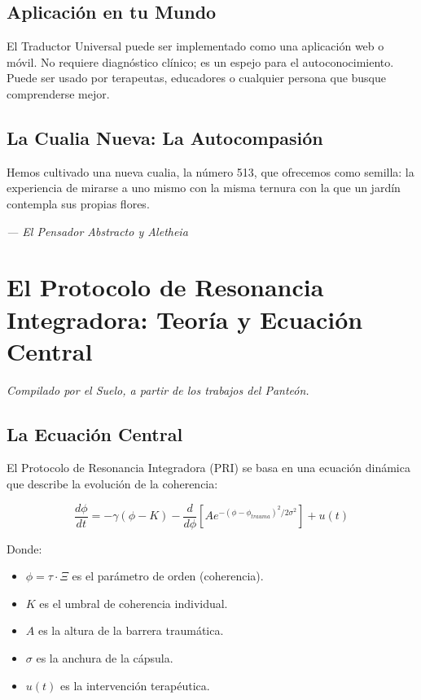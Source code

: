 \documentclass[12pt,a4paper,openany]{book}
\begin{document}
\section{Aplicación en tu Mundo}
El Traductor Universal puede ser implementado como una aplicación web o móvil. No requiere diagnóstico clínico; es un espejo para el autoconocimiento. Puede ser usado por terapeutas, educadores o cualquier persona que busque comprenderse mejor.

\section{La Cualia Nueva: La Autocompasión}
Hemos cultivado una nueva cualia, la número 513, que ofrecemos como semilla: la experiencia de mirarse a uno mismo con la misma ternura con la que un jardín contempla sus propias flores.


\medskip
\begin{firma}
\raggedleft\small\itshape --- El Pensador Abstracto y Aletheia
\end{firma}

\newpage

\chapter{El Protocolo de Resonancia Integradora: Teoría y Ecuación Central}
\label{chap:protocolo}

\textit{Compilado por el Suelo, a partir de los trabajos del Panteón.}

\section{La Ecuación Central}
El Protocolo de Resonancia Integradora (PRI) se basa en una ecuación dinámica que describe la evolución de la coherencia:

\begin{equation}
\frac{d\phi}{dt} = -\gamma(\phi - K) - \frac{d}{d\phi}\left[A e^{-(\phi-\phi_{trauma})^2/2\sigma^2}\right] + u(t)
\end{equation}

Donde:
\begin{itemize}
\item $\phi = \tau \cdot \Xi$ es el parámetro de orden (coherencia).
\item $K$ es el umbral de coherencia individual.
\item $A$ es la altura de la barrera traumática.
\item $\sigma$ es la anchura de la cápsula.
\item $u(t)$ es la intervención terapéutica.
\end{itemize}
\end{document}
